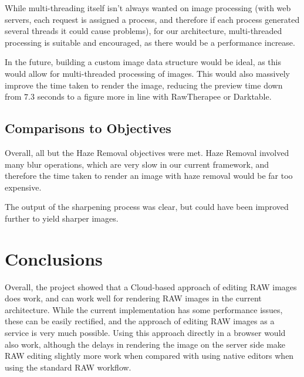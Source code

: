 \documentclass[10pt,a4paper]{article}
\begin{document}
While multi-threading itself isn't always wanted on image processing (with web servers, each request is assigned a process, and therefore if each process generated several threads it could
cause problems), for our architecture, multi-threaded processing is suitable and encouraged, as there would be a performance increase.

In the future, building a custom image data structure would be ideal, as this would allow for multi-threaded processing of images. This would also massively improve the time taken to
render the image, reducing the preview time down from $7.3$ seconds to a figure more in line with RawTherapee or Darktable.

\subsection{Comparisons to Objectives}

Overall, all but the Haze Removal objectives were met. Haze Removal involved many blur operations, which are very slow in our current framework, and therefore the
time taken to render an image with haze removal would be far too expensive. 

The output of the sharpening process was clear, but could have been improved further to yield sharper images.

\section{Conclusions}
Overall, the project showed that a Cloud-based approach of editing RAW images does work, and can work well for rendering RAW images in the current architecture.
While the current implementation has some performance issues, these can be easily rectified, and the approach of editing RAW images as a service is very much possible.
Using this approach directly in a browser would also work, although the delays in rendering the image on the server side make RAW editing slightly more work when compared with
using native editors when using the standard RAW workflow.


\end{document}
